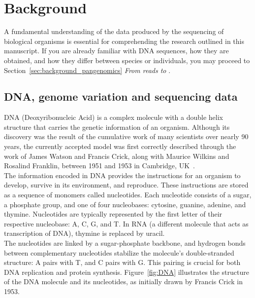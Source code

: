\chapter{Background}
\label{sec:background}
A fundamental understanding of the data produced by the sequencing of biological organisms is essential for comprehending the research outlined in this manuscript. If you are already familiar with DNA sequences, how they are obtained, and how they differ between species or individuals, you may proceed to Section~\ref{sec:background_pangenomics} \emph{From reads to \kmers}.
\section{DNA, genome variation and sequencing data}
\label{sec:dna}
\gls{DNA} (Deoxyribonucleic Acid) is a complex molecule with a double helix structure that carries the genetic information of an organism. Although its discovery was the result of the cumulative work of many scientists over nearly 90 years, the currently accepted model was first correctly described through the work of James Watson and Francis Crick, along with Maurice Wilkins and Rosalind Franklin, between 1951 and 1953 in Cambridge, UK~\cite{franklin}.\\
The information encoded in DNA provides the instructions for an organism to develop, survive in its environment, and reproduce. These instructions are stored as a sequence of monomers called nucleotides. Each nucleotide consists of a sugar, a phosphate group, and one of four nucleobases: cytosine, guanine, adenine, and thymine. Nucleotides are typically represented by the first letter of their respective nucleobase: A, C, G, and T. In \gls{RNA} (a different molecule that acts as transcription of DNA), thymine is replaced by uracil.\\
The nucleotides are linked by a sugar-phosphate backbone, and hydrogen bonds between complementary nucleotides stabilize the molecule's double-stranded structure: A pairs with T, and C pairs with G. This pairing is crucial for both DNA replication and protein synthesis. Figure~\ref{fig:DNA} illustrates the structure of the DNA molecule and its nucleotides, as initially drawn by Francis Crick in 1953.
